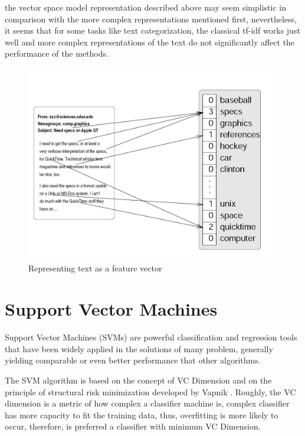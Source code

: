 the vector space model representation described above may seem simplistic
in comparison with the more complex representations mentioned first,
nevertheless, it seems that for some tasks like text categorization,
the classical tf-idf works just well and more complex representations
of the text do not significantly affect the performance of the methods.

%
\begin{figure}
\begin{centering}
\includegraphics[scale=0.2]{images/joachims-text-vect}
\par\end{centering}

\caption{Representing text as a feature vector \cite{Joachims98}}

\end{figure}


\section{Support Vector Machines}

Support Vector Machines (SVMs) \cite{Vapnik98} are powerful classification
and regression tools that have been widely applied in the solutions
of many problem, generally yielding comparable or even better performance
that other algorithms. 

The SVM algorithm is based on the concept of VC Dimension\cite{vapnik71uniform}
and on the principle of structural risk minimization developed by
Vapnik \cite{Vapnik99,vapnik71uniform}. Roughly, the VC dimension
is a metric of how complex a classifier machine is, complex classifier
has more capacity to fit the training data, thus, overfitting is more
likely to occur, therefore, is preferred a classifier with minimum
VC Dimension. 

